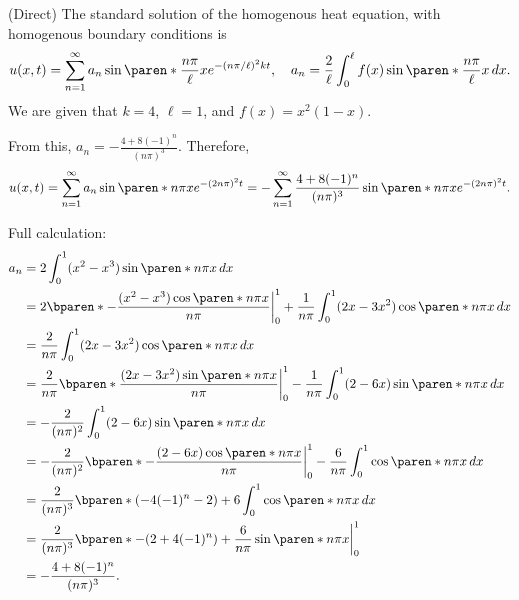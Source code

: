\documentclass[11pt]{penrose}
\begin{document}

\begin{problem}{3}
    
    (Direct) The standard solution of the homogenous heat equation, with homogenous boundary conditions is
    \begin{equation*}
        u(x,t) = \sum_{n=1}^{\infty} a_n \sin\paren*{\frac{n \pi}{\ell} x} e^{-(n\pi/\ell)^2 kt},
        \quad a_n = \frac{2}{\ell} \int_0^\ell f(x) \sin\paren*{\frac{n \pi}{\ell} x} \, dx.
    \end{equation*}
    We are given that $k = 4$, $\ell = 1$, and $f(x) = x^2 (1-x)$.

    From this, $a_n = -\frac{4 + 8(-1)^n}{(n \pi)^3}$. Therefore,
    \begin{equation*}
        u(x,t)
        = \sum_{n=1}^{\infty} a_n \sin\paren*{n \pi x} e^{-(2n\pi)^2 t}
        = -\sum_{n=1}^{\infty} \frac{4 + 8(-1)^n}{(n \pi)^3} \sin\paren*{n \pi x} e^{-(2n\pi)^2 t}.
    \end{equation*}

    Full calculation:
    \begin{align*}
        a_n
        &= 2 \int_0^1 (x^2 - x^3) \sin\paren*{n \pi x} \, dx\\
        &= 2 \bparen*{ -\frac{(x^2 - x^3) \cos\paren*{n \pi x}}{n \pi} \at[\bigg]{0}^{1} + \frac{1}{n \pi} \int_0^1 (2x - 3x^2) \cos\paren*{n \pi x} \, dx }\\
        &= \frac{2}{n \pi} \int_0^1 (2x - 3x^2) \cos\paren*{n \pi x} \, dx\\
        &= \frac{2}{n \pi} \bparen*{ \frac{(2x - 3x^2) \sin\paren*{n \pi x}}{n \pi} \at[\bigg]{0}^{1} - \frac{1}{n \pi} \int_0^1 (2 - 6x) \sin\paren*{n \pi x} \, dx }\\
        &= -\frac{2}{(n \pi)^2} \int_0^1 (2 - 6x) \sin\paren*{n \pi x} \, dx\\
        &= -\frac{2}{(n \pi)^2} \bparen*{ -\frac{(2 - 6x) \cos\paren*{n \pi x}}{n \pi} \at[\bigg]{0}^{1} - \frac{6}{n \pi} \int_0^1 \cos\paren*{n \pi x} \, dx }\\
        &= \frac{2}{(n \pi)^3} \bparen*{ (-4(-1)^n - 2) + 6 \int_0^1 \cos\paren*{n \pi x} \, dx }\\
        &= \frac{2}{(n \pi)^3} \bparen*{ -(2 + 4(-1)^n) + \frac{6}{n\pi}\sin\paren*{n \pi x} \at[\bigg]{0}^{1} }\\
        &= -\frac{4 + 8(-1)^n}{(n \pi)^3}.
    \end{align*}
\end{problem}
\end{document}
